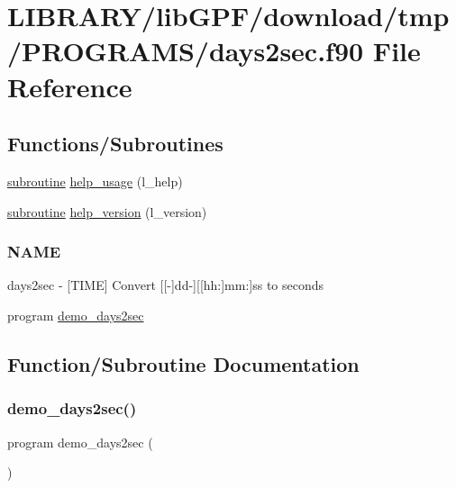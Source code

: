 \hypertarget{days2sec_8f90}{}\section{L\+I\+B\+R\+A\+R\+Y/lib\+G\+P\+F/download/tmp/\+P\+R\+O\+G\+R\+A\+M\+S/days2sec.f90 File Reference}
\label{days2sec_8f90}
\subsection*{Functions/\+Subroutines}
\begin{DoxyCompactItemize}
\item 
\hyperlink{M__stopwatch_83_8txt_acfbcff50169d691ff02d4a123ed70482}{subroutine} \hyperlink{days2sec_8f90_a3e09a3b52ee8fb04eeb93fe5761626a8}{help\+\_\+usage} (l\+\_\+help)
\item 
\hyperlink{M__stopwatch_83_8txt_acfbcff50169d691ff02d4a123ed70482}{subroutine} \hyperlink{days2sec_8f90_a39c21619b08a3c22f19e2306efd7f766}{help\+\_\+version} (l\+\_\+version)
\begin{DoxyCompactList}\small\item\em \subsubsection*{N\+A\+ME}

days2sec -\/ \mbox{[}T\+I\+ME\mbox{]} Convert \mbox{[}\mbox{[}-\/\mbox{]}dd-\/\mbox{]}\mbox{[}\mbox{[}hh\+:\mbox{]}mm\+:\mbox{]}ss to seconds \end{DoxyCompactList}\item 
program \hyperlink{days2sec_8f90_ae9a288b1c1af3c0a7a6a4434e2d163c8}{demo\+\_\+days2sec}
\end{DoxyCompactItemize}


\subsection{Function/\+Subroutine Documentation}
\mbox{\label{days2sec_8f90_ae9a288b1c1af3c0a7a6a4434e2d163c8}} 
\subsubsection{\texorpdfstring{demo\+\_\+days2sec()}{demo\_days2sec()}}
{\footnotesize\ttfamily program demo\+\_\+days2sec (\begin{DoxyParamCaption}{ }\end{DoxyParamCaption})}



